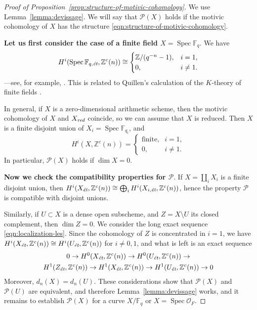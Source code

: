 \documentclass{article}
\DeclareMathOperator{\Spec}{Spec}
\newcommand{\FF}{\mathbb{F}}
\newcommand{\ZZ}{\mathbb{Z}}
\newcommand{\et}{\text{\it \'{e}t}}
\newcommand{\red}{\text{\it red}}
\theoremstyle{myplain}
\theoremstyle{mydefinition}
\begin{document}
\begin{proof}[Proof of Proposition~\ref{prop:structure-of-motivic-cohomology}]
  We use Lemma~\ref{lemma:devissage}. We will say that $\mathcal{P} (X)$ holds
  if the motivic cohomology of $X$ has the structure
  \eqref{eqn:structure-of-motivic-cohomology}.

  \vspace{1em}

  \textbf{Let us first consider the case of a finite field $X = \Spec \FF_q$}.
  We have
  \begin{equation}
    \label{eqn:motivic-cohomology-finite-fields}
    H^i (\Spec \FF_{q,\et}, \ZZ^c (n)) \cong
    \begin{cases}
      \ZZ/(q^{-n} - 1), & i = 1, \\
      0, & i \ne 1.
    \end{cases}
  \end{equation}
  ---see, for example, \cite[Example~4.2]{Geisser-2017}. This is related to
  Quillen's calculation of the $K$-theory of finite fields \cite{Quillen-1972}.

  In general, if $X$ is a zero-dimensional arithmetic scheme, then the motivic
  cohomology of $X$ and $X_\red$ coincide, so we can assume that $X$ is
  reduced. Then $X$ is a finite disjoint union of $X_i = \Spec \FF_{q_i}$, and
  \begin{equation}
    H^i (X, \ZZ^c (n)) = \begin{cases}
      \text{finite}, & i = 1, \\
      0, & i \ne 1.
    \end{cases}
  \end{equation}
  In particular, $\mathcal{P} (X)$ holds if $\dim X = 0$.

  \vspace{1em}

  \textbf{Now we check the compatibility properties for $\mathcal{P}$}.
  If $X = \coprod_i X_i$ is a finite disjoint union, then
  $H^i (X_\et, \ZZ^c (n)) \cong \bigoplus_i H^i (X_{i,\et}, \ZZ^c (n))$,
  hence the property $\mathcal{P}$ is compatible with disjoint unions.

  Similarly, if $U \subset X$ is a dense open subscheme, and $Z = X\setminus U$
  its closed complement, then $\dim Z = 0$. We consider the long exact sequence
  \eqref{eqn:localization-les}. Since the cohomology of $Z$ is concentrated in
  $i = 1$, we have $H^i (X_\et, \ZZ^c (n)) \cong H^i (U_\et, \ZZ^c (n))$ for
  $i \ne 0,1$, and what is left is an exact sequence
  \begin{multline*}
    0 \to H^0 (X_\et, \ZZ^c (n)) \to
    H^0 (U_\et, \ZZ^c (n)) \to \\
    H^1 (Z_\et, \ZZ^c (n)) \to
    H^1 (X_\et, \ZZ^c (n)) \to
    H^1 (U_\et, \ZZ^c (n)) \to 0
  \end{multline*}
  Moreover, $d_n (X) = d_n (U)$. These considerations show that
  $\mathcal{P} (X)$ and $\mathcal{P} (U)$ are equivalent, and therefore
  Lemma~\ref{lemma:devissage} works, and it remains to establish
  $\mathcal{P} (X)$ for a curve $X/\FF_q$ or $X = \Spec \mathcal{O}_F$.


\end{proof}
\end{document}
